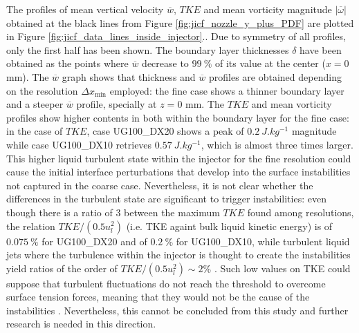 The profiles of mean vertical velocity $\overline{w}$, $TKE$ and mean vorticity magnitude $|\overline{\omega}|$ obtained at the black lines from Figure \ref{fig:jicf_nozzle_y_plus_PDF} are plotted in Figure \ref{fig:jicf_data_lines_inside_injector}.. Due to symmetry of all profiles, only the first half has been shown. The boundary layer thicknesses $\delta$ have been obtained as the points where $\overline{w}$ decrease to $99~\%$ of its value at the center ($x = 0$ mm). The $\overline{w}$ graph shows that thickness and $\overline{w}$ profiles are obtained depending on the resolution $\Delta x_\mathrm{min}$ employed: the fine case shows a thinner boundary layer and a steeper $\overline{w}$ profile, specially at $z = 0$ mm. The $TKE$ and mean vorticity profiles show higher contents in both within the boundary layer for the fine case: in the case of $TKE$, case UG100\_DX20 shows a peak of $0.2~J.kg^{-1}$ magnitude while case UG100\_DX10 retrieves $0.57~J.kg^{-1}$, which is almost three times larger. This higher liquid turbulent state within the injector for the fine resolution could cause the initial interface perturbations that develop into the surface instabilities not captured in the coarse case. Nevertheless, it is not clear whether the differences in the turbulent state are significant to trigger instabilities: even though there is a ratio of 3 between the maximum $TKE$ found among resolutions, the relation $TKE/ \left( 0.5 u_l^2 \right)$ (i.e. TKE againt bulk liquid kinetic energy) is of $0.075~\%$ for UG100\_DX20 and of $0.2~\%$ for UG100\_DX10, while turbulent liquid jets where the turbulence within the injector is thought to create the instabilities  yield ratios of the order of $TKE/ \left( 0.5 u_l^2 \right) \sim 2 \%$ . Such low values on TKE could suppose that turbulent fluctuations do not reach the threshold to overcome surface tension forces, meaning that they would not be the cause of the instabilities . Nevertheless, this cannot be concluded from this study and further research is needed in this direction.


